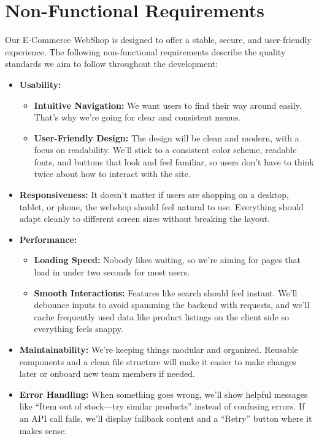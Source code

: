 \documentclass[a4paper,12pt]{article}
\begin{document}
	\section{Non-Functional Requirements}  

Our E-Commerce WebShop is designed to offer a stable, secure, and user-friendly experience. The following non-functional requirements describe the quality standards we aim to follow throughout the development:

\begin{itemize}
    \item \textbf{Usability:}  
    \begin{itemize}
        \item \textbf{Intuitive Navigation:}  
        We want users to find their way around easily. That’s why we’re going for clear and consistent menus.

        \item \textbf{User-Friendly Design:}  
        The design will be clean and modern, with a focus on readability. We’ll stick to a consistent color scheme, readable fonts, and buttons that look and feel familiar, so users don’t have to think twice about how to interact with the site.
    \end{itemize}

    \item \textbf{Responsiveness:}  
    It doesn't matter if users are shopping on a desktop, tablet, or phone, the webshop should feel natural to use. Everything should adapt cleanly to different screen sizes without breaking the layout.

    \item \textbf{Performance:}  
    \begin{itemize}
        \item \textbf{Loading Speed:}  
        Nobody likes waiting, so we're aiming for pages that load in under two seconds for most users.

        \item \textbf{Smooth Interactions:}  
        Features like search should feel instant. We'll debounce inputs to avoid spamming the backend with requests, and we’ll cache frequently used data like product listings on the client side so everything feels snappy.
    \end{itemize}

    \item \textbf{Maintainability:}  
    We’re keeping things modular and organized. Reusable components and a clean file structure will make it easier to make changes later or onboard new team members if needed.

    \item \textbf{Error Handling:}  
        When something goes wrong, we'll show helpful messages like “Item out of stock—try similar products” instead of confusing errors. If an API call fails, we’ll display fallback content and a “Retry” button where it makes sense.
\end{itemize}
\end{document}
